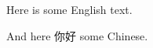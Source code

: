 \documentclass[UTF8]{ctexart}
\begin{document}
 
  Here is some English text.

  And here 你好 some Chinese.
\end{document}
